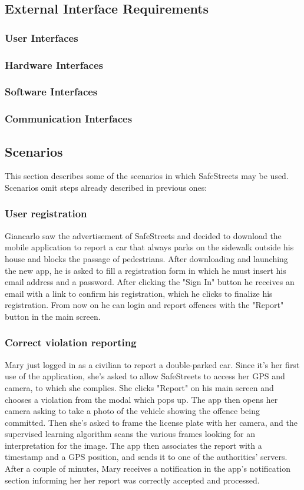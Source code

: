 \documentclass[12pt,a4paper]{article}
\begin{document}
\subsection{External	Interface	Requirements} 
\subsubsection{User	Interfaces}
\subsubsection{Hardware	Interfaces}
\subsubsection{Software	Interfaces}
\subsubsection{Communication	Interfaces}
\subsection{Scenarios}
This section describes some of the scenarios in which SafeStreets may be used. Scenarios omit steps already described in previous ones: 

\subsubsection{User registration}
Giancarlo saw the advertisement of SafeStreets and decided to download the mobile application to report a car that always parks on the sidewalk outside his house and blocks the passage of pedestrians. After downloading and launching the new app, he is asked to fill a registration form in which he must insert his email address and a password. After clicking the "Sign In" button he receives an email with a link to confirm his registration, which he clicks to finalize his registration. From now on he can login and report offences with the "Report" button in the main screen.

\subsubsection{Correct violation reporting}
Mary just logged in as a civilian to report a double-parked car. Since it's her first use of the application, she's asked to allow SafeStreets to access her GPS and camera, to which she complies. She clicks "Report" on his main screen and chooses a violation from the modal which pops up. The app then opens her camera asking to take a photo of the vehicle showing the offence being committed. Then she's asked to frame the license plate with her camera, and the supervised learning algorithm scans the various frames looking for an interpretation for the image. The app then associates the report with a timestamp and a GPS position, and sends it to one of the authorities' servers. After a couple of minutes, Mary receives a notification in the app's notification section informing her her report was correctly accepted and processed.
\end{document}
